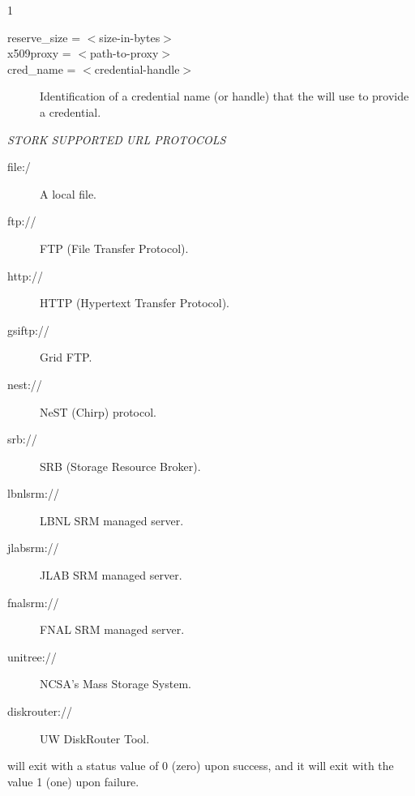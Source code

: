 \begin{ManPage}{\label{man-stork-submit}}{1}
\begin{description}
\item[reserve\_size = $<$size-in-bytes$>$]

\item[x509proxy = $<$path-to-proxy$>$]

\item[cred\_name = $<$credential-handle$>$]
Identification of a credential name (or handle) that the 
 will use to provide a credential.

\end{description}

\emph{STORK SUPPORTED URL PROTOCOLS}

\begin{description}
\item[file:/]
  A local file.
\item[ftp://]
  FTP (File Transfer Protocol).
\item[http://]
  HTTP (Hypertext Transfer Protocol).
\item[gsiftp://]
  Grid FTP.
\item[nest://]
  NeST (Chirp) protocol.
\item[srb://]
  SRB (Storage Resource Broker).
\item[lbnlsrm://]
  LBNL SRM managed server.
\item[jlabsrm://]
  JLAB SRM managed server.
\item[fnalsrm://]
  FNAL SRM managed server.
\item[unitree://]
  NCSA's Mass Storage System.
\item[diskrouter://]
  UW DiskRouter Tool.
\end{description}

\begin{Options}
	\ToolArgsBaseDesc
	\StorknameDesc
\end{Options}

\ExitStatus

 will exit with a status value of 0 (zero) upon success,
and it will exit with the value 1 (one) upon failure.

\end{ManPage}
